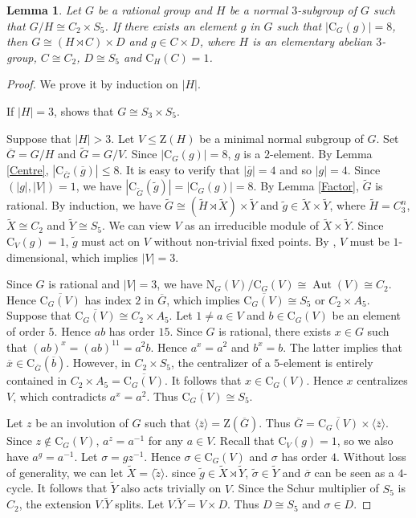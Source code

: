 \documentclass[11pt]{article}
\providecommand{\N}{{\mathrm{N}}}
\providecommand{\C}{{\mathrm{C}}}
\providecommand{\Z}{{\mathrm{Z}}}
\providecommand{\Aut}{{\operatorname{Aut}}}
\providecommand{\gen}[1]{\langle #1 \rangle} %
\providecommand{\gen}[1]{\langle #1 \rangle} %
\providecommand{\gen}[1]{\langle #1 \rangle} %
\providecommand{\olb}{{\overline{b}}}
\providecommand{\olg}{{\overline{g}}}
\providecommand{\olx}{{\overline{x}}}
\providecommand{\olz}{{\overline{z}}}
\providecommand{\olG}{{\overline{G}}}
\providecommand{\wtg}{{\widetilde{g}}}
\providecommand{\wtz}{{\widetilde{z}}}
\providecommand{\wtG}{{\widetilde{G}}}
\providecommand{\wtH}{{\widetilde{H}}}
\providecommand{\wtX}{{\widetilde{X}}}
\providecommand{\wtY}{{\widetilde{Y}}}
\newtheorem{lem}{Lemma}
\begin{document}
\begin{lem}
\label{C2S5}
    Let $G$ be a rational group and $H$ be a normal $3$-subgroup of $G$ 
    such that $G/H \cong C_2 \times S_5$. 
    If there exists an element $g$ in $G$ such that $|\C_G(g)|=8$, 
    then $G \cong (H \rtimes C) \times D$ and $g\in C\times D$,
    where $H$ is an elementary abelian $3$-group, $C\cong C_2$, $D\cong S_5$ and $\C_H(C)=1$.
\end{lem}

\begin{proof}
    We prove it by induction on $|H|$.

    If $|H|=3$, \cite[Code 17]{Git} shows that $G\cong S_3\times S_5$.

    Suppose that $|H|>3$. 
    Let $V\leq \Z(H)$ be a minimal normal subgroup of $G$.
    Set $\olG = G/H$ and $\wtG = G/V$.
    Since $|\C_G(g)|=8$, $g$ is a $2$-element. 
    By Lemma \ref{Centre}, $|\C_{\olG}(\olg)|\leq 8$.
    It is easy to verify that $|\olg|=4$ and so $|g|=4$.
    Since $(|g|,|V|)=1$, we have $|\C_{\wtG}(\wtg)| = |\C_G(g)| = 8$. 
    By Lemma \ref{Factor}, $\wtG$ is rational.
    By induction, we have $\wtG\cong (\wtH \rtimes \wtX)\times \wtY$ and $\wtg \in \wtX\times \wtY$,
    where $\wtH=C_3^n$, $\wtX\cong C_2$ and $\wtY\cong S_5$.
    We can view $V$ as an irreducible module of $\wtX\times \wtY$. 
    Since $\C_V(g)=1$, $\wtg$ must act on $V$ without non-trivial fixed points. 
    By \cite[Code 17]{Git}, $V$ must be $1$-dimensional, which implies $|V|=3$.

    Since $G$ is rational and $|V|=3$, we have $\N_G(V)/\C_G(V)\cong \Aut(V)\cong C_2$.
    Hence $\overline{\C_G(V)}$ has index $2$ in $\olG$, which implies $\overline{\C_G(V)}\cong S_5$ or $C_2\times A_5$.
    Suppose that $\overline{\C_G(V)}\cong C_2\times A_5$. 
    Let $1\neq a\in V$ and $b\in \C_G(V)$ be an element of order $5$. 
    Hence $ab$ has order $15$. 
    Since $G$ is rational, there exists $x\in G$ such that $(ab)^x=(ab)^{11}=a^2b$. 
    Hence $a^x=a^2$ and $b^x=b$. The latter implies that $\olx\in \C_{\olG}(\olb)$. 
    However, in $C_2 \times S_5$, the centralizer of a $5$-element is entirely contained in $C_2 \times A_5 = \overline{\C_G(V)}$. 
    It follows that $x\in \C_G(V)$.
    Hence $x$ centralizes $V$, which contradicts $a^x=a^2$. 
    Thus $\overline{\C_G(V)}\cong S_5$.

    Let $z$ be an involution of $G$ such that $\gen{\olz}=\Z(\olG)$.
    Thus $\olG =\overline{\C_G(V)} \times \gen{\olz}$. 
    Since $z \notin \C_G(V)$, $a^z=a^{-1}$ for any $a\in V$.
    Recall that $\C_V(g)=1$, so we also have $a^g=a^{-1}$. Let $\sigma = gz^{-1}$. 
    Hence $\sigma \in \C_G(V)$ and $\sigma$ has order $4$.
    Without loss of generality, we can let $\wtX= \gen{\wtz}$.
    since $\wtg\in \wtX\rtimes \wtY$, 
    $\widetilde{\sigma}\in \wtY$ and $\overline{\sigma}$ can be seen as a $4$-cycle.
    It follows that $\wtY$ also acts trivially on $V$.
    Since the Schur multiplier of $S_5$ is $C_2$, 
    the extension $V.\wtY$ splits. 
    Let $V.\wtY = V\times D$.
    Thus $D\cong S_5$ and $\sigma \in D$.


\end{proof}
\end{document}
